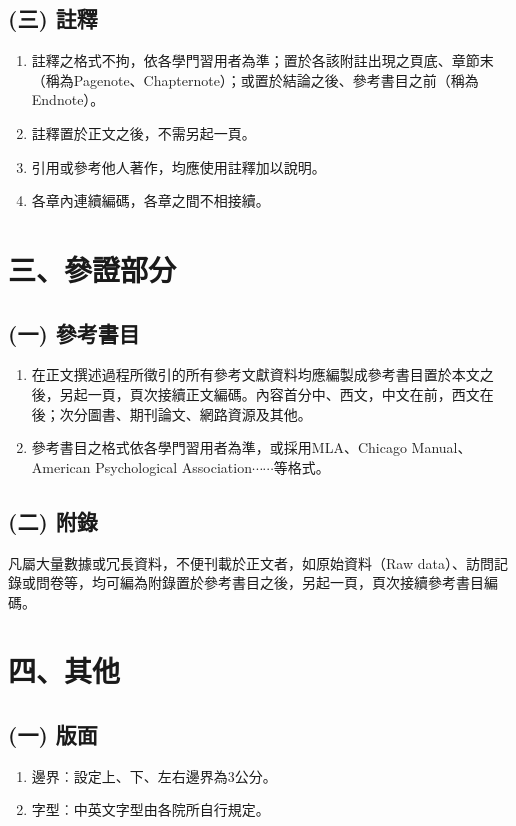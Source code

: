 \documentclass[12pt,oneside,openany,a4paper]{book}
\begin{document}
\subsection{(三) 註釋}
\begin{enumerate}
    \item 註釋之格式不拘，依各學門習用者為準；置於各該附註出現之頁底、章節末（稱為Pagenote、Chapternote）；或置於結論之後、參考書目之前（稱為Endnote）。
    \item 註釋置於正文之後，不需另起一頁。
    \item 引用或參考他人著作，均應使用註釋加以說明。
    \item 各章內連續編碼，各章之間不相接續。
\end{enumerate}

\section{三、參證部分}
\subsection{(一) 參考書目}
\begin{enumerate}
    \item 在正文撰述過程所徵引的所有參考文獻資料均應編製成參考書目置於本文之後，另起一頁，頁次接續正文編碼。內容首分中、西文，中文在前，西文在後；次分圖書、期刊論文、網路資源及其他。
    \item 參考書目之格式依各學門習用者為準，或採用MLA、Chicago Manual、American Psychological Association$\cdots\cdots$等格式。
\end{enumerate}

\subsection{(二) 附錄}
     凡屬大量數據或冗長資料，不便刊載於正文者，如原始資料（Raw data）、訪問記錄或問卷等，均可編為附錄置於參考書目之後，另起一頁，頁次接續參考書目編碼。

\section{四、其他}
\subsection{(一) 版面}
\begin{enumerate}
    \item 邊界︰設定上、下、左右邊界為3公分。
    \item 字型︰中英文字型由各院所自行規定。
\end{enumerate}
\end{document}
